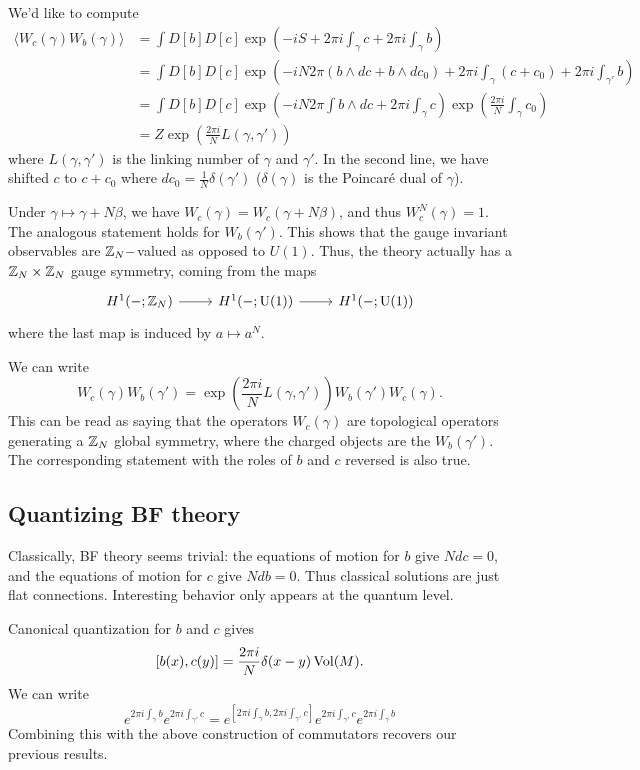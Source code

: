 We'd like to compute
\begin{align*}
	\langle W_c(\gamma) W_b(\gamma) \rangle &= \int D[b] D[c] \exp\left(-iS + 2\pi i \int_\gamma c + 2\pi i \int_\gamma b\right) \\
						&= \int D[b] D[c] \exp\left(-i N 2\pi (b \wedge dc + b \wedge dc_0) + 2\pi i \int_\gamma (c + c_0) + 2\pi i \int_{\gamma'} b\right) \\
						&= \int D[b] D[c] \exp\left(-i N 2\pi \int b \wedge dc + 2\pi i \int_\gamma c\right) \exp\left( \frac{2\pi i}{N} \int_\gamma c_0 \right) \\
						&= Z \exp\left(\frac{2\pi i}{N} L(\gamma, \gamma')\right)
\end{align*}
where $L(\gamma, \gamma')$ is the linking number of $\gamma$ and $\gamma'$. In the second line, we have shifted $c$ to $c + c_0$ where $d c_0 = \frac 1 N \delta(\gamma')$ ($\delta(\gamma)$ is the Poincar\'e dual of $\gamma$).

Under $\gamma \mapsto \gamma + N \beta$, we have $W_c(\gamma) = W_c(\gamma + N \beta)$, and thus $W_c^N(\gamma) = 1$.
The analogous statement holds for $W_b(\gamma')$. This shows that the gauge invariant observables are $\mathbb{Z}_N-$valued as opposed to $U(1)$. Thus, the theory actually has a $\mathbb{Z}_N \times \mathbb{Z}_N$ gauge symmetry, coming from the maps
\[
	\begin{tikzcd}
		H^1(-; \ZZ_N) \rar & H^1(-; \U(1)) \rar & H^1(-; \U(1))
	\end{tikzcd}
\]
where the last map is induced by $a \mapsto a^N$.

We can write
\[
	W_c(\gamma) W_b(\gamma') = \exp\left(\frac{2\pi i}{N} L(\gamma, \gamma')\right) W_b(\gamma') W_c(\gamma).
\]
This can be read as saying that the operators $W_c(\gamma)$ are topological operators generating a $\mathbb{Z}_N$ global symmetry, where the charged objects are the $W_b(\gamma')$.
The corresponding statement with the roles of $b$ and $c$ reversed is also true.

\subsection{Quantizing BF theory}

Classically, BF theory seems trivial: the equations of motion for $b$ give $N dc = 0$, and the equations of motion for $c$ give $N db = 0$.
Thus classical solutions are just flat connections.
Interesting behavior only appears at the quantum level.

Canonical quantization for $b$ and $c$ gives
\[
	[b(x), c(y)] = \frac{2\pi i}{N} \delta(x - y) \operatorname{Vol}(M).
\]
We can write
\[
	e^{2\pi i \int_\gamma b} e^{2\pi i \int_{\gamma'} c} = e^{\left[2\pi i \int_\gamma b, 2\pi i \int_{\gamma'} c\right]} e^{2\pi i \int_{\gamma'} c} e^{2\pi i \int_\gamma b}
\]
Combining this with the above construction of commutators recovers our previous results.

